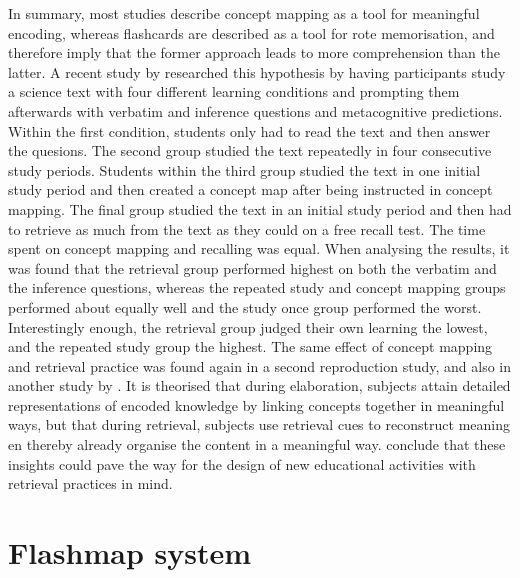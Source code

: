 In summary, most studies describe concept mapping as a tool for meaningful encoding, whereas flashcards are described as a tool for rote memorisation, and therefore imply that the former approach leads to more comprehension than the latter. A recent study by  researched this hypothesis by having participants study a science text with four different learning conditions and prompting them afterwards with verbatim and inference questions and metacognitive predictions. Within the first condition, students only had to read the text and then answer the quesions. The second group studied the text repeatedly in four consecutive study periods. Students within the third group studied the text in one initial study period and then created a concept map after being instructed in concept mapping. The final group studied the text in an initial study period and then had to retrieve as much from the text as they could on a free recall test. The time spent on concept mapping and recalling was equal. When analysing the results, it was found that the retrieval group performed highest on both the verbatim and the inference questions, whereas the repeated study and concept mapping groups performed about equally well and the study once group performed the worst. Interestingly enough, the retrieval group judged their own learning the lowest, and the repeated study group the highest. The same effect of concept mapping and retrieval practice was found again in a second reproduction study, and also in another study by . It is theorised that during elaboration, subjects attain detailed representations of encoded knowledge by linking concepts together in meaningful ways, but that during retrieval, subjects use retrieval cues to reconstruct meaning en thereby already organise the content in a meaningful way.  conclude that these insights could pave the way for the design of new educational activities with retrieval practices in mind.

\section{Flashmap system}

\label{sec:intro_flashmap}

